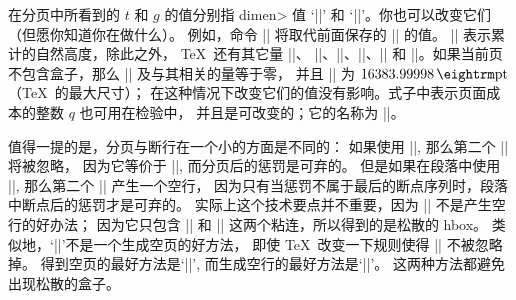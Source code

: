 \ddanger 在分页中所看到的 $t$ 和 $g$ 的值分别指 \<dimen> 值
`|\pagetotal|' 和 `|\pagegoal|'。你也可以改变它们（但愿你知道你在做什么）。
例如，命令 |\pagegoal=500pt| 将取代前面保存的 |\vsize| 的值。
|\pagetotal| 表示累计的自然高度，除此之外， \TeX\ 还有其它量 |\pagestretch|、
|\pagefilstretch|、|\pagefillstretch|、|\pagefilllstretch|、|\pageshrink| 和
|\pagedepth|。如果当前页不包含盒子，那么 |\pagetotal| 及与其相关的量等于零，
并且 |\pagegoal| 为 $16383.99998\pt$（\TeX\ 的最大尺寸）；
在这种情况下改变它们的值没有影响。式子中表示页面成本的整数 $q$ 也可用在检验中，
并且是可改变的；它的名称为 |\insertpenalties|。

\ddanger 值得一提的是，分页与断行在一个小的方面是不同的：
如果使用 |\eject\eject|, 那么第二个 |\eject| 将被忽略，
因为它等价于 ||, 而分页后的惩罚是可弃的。%
但是如果在段落中使用 |\break\break|, 那么第二个 |\break| 产生一个空行，
因为只有当惩罚不属于最后的断点序列时，段落中断点后的惩罚才是可弃的。%
实际上这个技术要点并不重要，因为 |\break\break| 不是产生空行的好办法；
因为它只包含 |\leftskip| 和 |\rightskip| 这两个粘连，所以得到的是松散的 hbox。%
类似地，`|\eject\eject|'不是一个生成空页的好方法，
即使 \TeX\ 改变一下规则使得 |\eject| 不被忽略掉。%
得到空页的最好方法是`|\eject\line{}\vfil\eject|',
而生成空行的最好方法是`|\break\hbox{}\hfil\break|'。%
这两种方法都避免出现松散的盒子。


